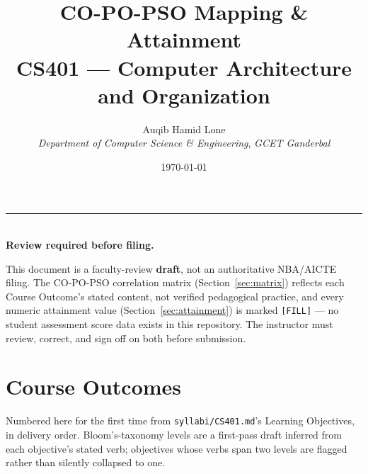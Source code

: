 \documentclass[11pt]{article}
\title{CO-PO-PSO Mapping \& Attainment\\\large CS401 --- Computer Architecture and Organization}
\author{Auqib Hamid Lone\\[0.3em]
  \emph{Department of Computer Science \& Engineering}, \emph{GCET Ganderbal}}
\date{\today}
\newenvironment{noticebox}{%
  \par\noindent\begin{minipage}{\linewidth}\vspace{0.4em}
  \textcolor{negative}{\rule{\linewidth}{1.2pt}}\\[0.3em]
  \textbf{\textcolor{negative}{Review required before filing.}}\ \itshape
}{%
  \end{minipage}\vspace{0.6em}\par
}
\begin{document}
\maketitle

\begin{noticebox}
This document is a faculty-review \textbf{draft}, not an authoritative NBA/AICTE filing. The CO-PO-PSO correlation matrix (Section~\ref{sec:matrix}) reflects each Course Outcome's stated content, not verified pedagogical practice, and every numeric attainment value (Section~\ref{sec:attainment}) is marked \texttt{[FILL]} --- no student assessment score data exists in this repository. The instructor must review, correct, and sign off on both before submission.
\end{noticebox}

\section{Course Outcomes}

Numbered here for the first time from \texttt{syllabi/CS401.md}'s Learning Objectives, in delivery order. Bloom's-taxonomy levels are a first-pass draft inferred from each objective's stated verb; objectives whose verbs span two levels are flagged rather than silently collapsed to one.
\end{document}
